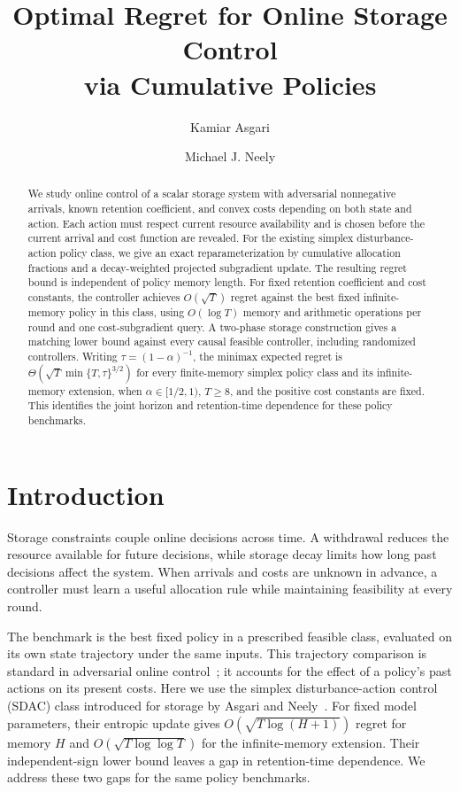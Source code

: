 \documentclass[11pt]{article}
\title{Optimal Regret for Online Storage Control\\
via Cumulative Policies}
\author{Kamiar Asgari \and Michael J. Neely}
\date{}
\begin{document}
\maketitle

\begin{abstract}
We study online control of a scalar storage system with adversarial
nonnegative arrivals, known retention coefficient, and convex costs
depending on both state and action. Each action must respect current
resource availability and is chosen before the current arrival and
cost function are revealed. For the existing simplex disturbance-action
policy class, we give an exact reparameterization by cumulative
allocation fractions and a decay-weighted projected subgradient update.
The resulting regret bound is independent of policy memory length.
For fixed retention coefficient and cost constants, the controller
achieves $O(\sqrt T)$ regret against the best fixed infinite-memory
policy in this class, using $O(\log T)$ memory and arithmetic operations
per round and one cost-subgradient query. A two-phase storage
construction gives a matching lower bound against every causal feasible
controller, including randomized controllers. Writing
$\tau=(1-\alpha)^{-1}$, the minimax expected regret is
$\Theta(\sqrt T\min\{T,\tau\}^{3/2})$ for every finite-memory
simplex policy class and its infinite-memory extension, when
$\alpha\in[1/2,1)$, $T\ge8$, and the positive cost constants are fixed.
This identifies the joint horizon and retention-time dependence for
these policy benchmarks.
\end{abstract}

\section{Introduction}

Storage constraints couple online decisions across time. A withdrawal
reduces the resource available for future decisions, while storage
decay limits how long past decisions affect the system. When arrivals
and costs are unknown in advance, a controller must learn a useful
allocation rule while maintaining feasibility at every round.

The benchmark is the best fixed policy in a prescribed feasible
class, evaluated on its own state trajectory under the same inputs.
This trajectory comparison is standard in adversarial online
control~\cite{agarwal2019online}; it accounts for the effect of a
policy's past actions on its present costs. Here we use the simplex
disturbance-action control (SDAC) class introduced for storage by
Asgari and Neely~\cite{asgari2026sdac}. For fixed model parameters,
their entropic update gives $O(\sqrt{T\log(H+1)})$ regret for memory
$H$ and $O(\sqrt{T\log\log T})$ for the infinite-memory extension.
Their independent-sign lower bound leaves a gap in retention-time
dependence. We address these two gaps for the same policy benchmarks.
\end{document}
